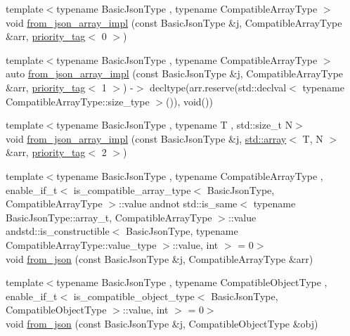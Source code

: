 \begin{DoxyCompactItemize}
\item 
{\footnotesize template$<$typename Basic\+Json\+Type , typename Compatible\+Array\+Type $>$ }\\void \hyperlink{namespacenlohmann_1_1detail_ac53673a5ce29fb69b96d41dad33cb3b0}{from\+\_\+json\+\_\+array\+\_\+impl} (const Basic\+Json\+Type \&j, Compatible\+Array\+Type \&arr, \hyperlink{structnlohmann_1_1detail_1_1priority__tag}{priority\+\_\+tag}$<$ 0 $>$)
\item 
{\footnotesize template$<$typename Basic\+Json\+Type , typename Compatible\+Array\+Type $>$ }\\auto \hyperlink{namespacenlohmann_1_1detail_a57f93ed57254a1639087cdc316e0fb83}{from\+\_\+json\+\_\+array\+\_\+impl} (const Basic\+Json\+Type \&j, Compatible\+Array\+Type \&arr, \hyperlink{structnlohmann_1_1detail_1_1priority__tag}{priority\+\_\+tag}$<$ 1 $>$) -\/$>$ decltype(arr.\+reserve(std\+::declval$<$ typename Compatible\+Array\+Type\+::size\+\_\+type $>$()), void())
\item 
{\footnotesize template$<$typename Basic\+Json\+Type , typename T , std\+::size\+\_\+t N$>$ }\\void \hyperlink{namespacenlohmann_1_1detail_a46b0781205d0bdc5a959343b389966a4}{from\+\_\+json\+\_\+array\+\_\+impl} (const Basic\+Json\+Type \&j, \hyperlink{namespacenlohmann_1_1detail_a1ed8fc6239da25abcaf681d30ace4985af1f713c9e000f5d3f280adbd124df4f5}{std\+::array}$<$ T, N $>$ \&arr, \hyperlink{structnlohmann_1_1detail_1_1priority__tag}{priority\+\_\+tag}$<$ 2 $>$)
\item 
{\footnotesize template$<$typename Basic\+Json\+Type , typename Compatible\+Array\+Type , enable\+\_\+if\+\_\+t$<$ is\+\_\+compatible\+\_\+array\+\_\+type$<$ Basic\+Json\+Type, Compatible\+Array\+Type $>$\+::value andnot std\+::is\+\_\+same$<$ typename Basic\+Json\+Type\+::array\+\_\+t, Compatible\+Array\+Type $>$\+::value andstd\+::is\+\_\+constructible$<$ Basic\+Json\+Type, typename Compatible\+Array\+Type\+::value\+\_\+type $>$\+::value, int $>$  = 0$>$ }\\void \hyperlink{namespacenlohmann_1_1detail_a8dcac00852dbe1f61d1e78135b19d428}{from\+\_\+json} (const Basic\+Json\+Type \&j, Compatible\+Array\+Type \&arr)
\item 
{\footnotesize template$<$typename Basic\+Json\+Type , typename Compatible\+Object\+Type , enable\+\_\+if\+\_\+t$<$ is\+\_\+compatible\+\_\+object\+\_\+type$<$ Basic\+Json\+Type, Compatible\+Object\+Type $>$\+::value, int $>$  = 0$>$ }\\void \hyperlink{namespacenlohmann_1_1detail_a5e7a3674e8ac46f8feebad9712d7c55f}{from\+\_\+json} (const Basic\+Json\+Type \&j, Compatible\+Object\+Type \&obj)

\end{DoxyCompactItemize}
